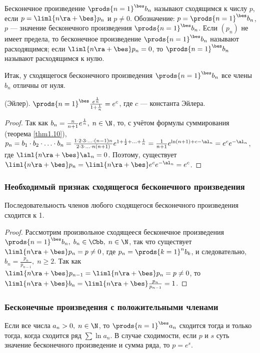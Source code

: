 \documentclass[a4paper]{article}
\begin{document}
\begin{df}
Бесконечное произведение $\prods{n=1}^{\bes}b_n$ называют сходящимся
к числу $p$, если $p=\liml{n\ra+\bes}p_n$ и $p\ne0$. Обозначение:
$p=\prods{n=1}^{\bes}b_n$, $p$ --- значение бесконечного
произведения $\prods{n=1}^{\bes}b_n$. Если $(p_n)$ не имеет предела,
то бесконечное произведение $\prods{n=1}^{\bes}b_n$ называют
расходящимся; если $\liml{n\ra+\bes}p_n=0$, то
$\prods{n=1}^{\bes}b_n$ называют расходящимся к нулю.
\end{df}
Итак, у сходящегося бесконечного произведения
$\prods{n=1}^{\bes}b_n$ все члены $b_n$ отличны от нуля.

\begin{ex}
(Эйлер). $\prods{n=1}^{\bes} \frac{e^{\frac1n}}{1+\frac1n}=e^c$, где
$c$ --- константа Эйлера.
\end{ex}

\begin{proof}
Так как $b_n=\frac{n}{n+1}e^{\frac1n}, \; n\in\N$, то, с учётом
формулы суммирования (теорема \ref{thm1.10}), $p_n=b_1\cdot
b_2\cdot\ldots\cdot b_n = \frac{1\cdot2\cdot3\cdot\ldots\cdot(n-1)
n}{2\cdot3\cdot\ldots\cdot n(n+1)} e^{1+\frac12+\ldots+\frac1n} =
\frac1{n+1} e^{\ln(n+1)+c-\al_n}=e^c e^{-\al_n}$, где
$\liml{n\ra+\bes}\al_n=0$. Поэтому, существует
$\liml{n\ra+\bes}p_n=\liml{n\ra+\bes}e^c e^{-\al_n}=e^c$.
\end{proof}

\subsubsection{Необходимый признак сходящегося бесконечного
произведения}

\begin{theorem}
Последовательность членов любого сходящегося бесконечного
произведения сходится к 1.
\end{theorem}

\begin{proof}
Рассмотрим произвольное сходящееся бесконечное произведения
$\prods{n=1}^{\bes}b_n, \; b_n\in\Cbb, \; n\in\N$, так что
существует $\liml{n\ra+\bes}p_n=p\ne0$, где $p_n=\prods{k=1}^n b_k$,
и следовательно, $b_n = \frac{p_n}{p_{n-1}}, \; n\ge2$. Так как
$\liml{n\ra+\bes} p_{n-1} = \liml{n\ra+\bes}p_n=p\ne0$, то
$\liml{n\ra+\bes} b_n = \liml{n\ra+\bes} \frac{p_n}{p_{n-1}}=1$.
\end{proof}

\subsubsection{Бесконечные произведения с положительными членами}
\begin{theorem}\label{thm1.42}
Если все числа $a_n>0, \; n\in\N$, то $\prods{n=1}^{\bes}a_n$
сходится тогда и только тогда, когда сходится ряд $\sum\ln a_n$. В
случае сходимости, если $p$ и $s$ суть значение бесконечного
произведение и сумма ряда, то $p=e^s$.
\end{theorem}
\end{document}
